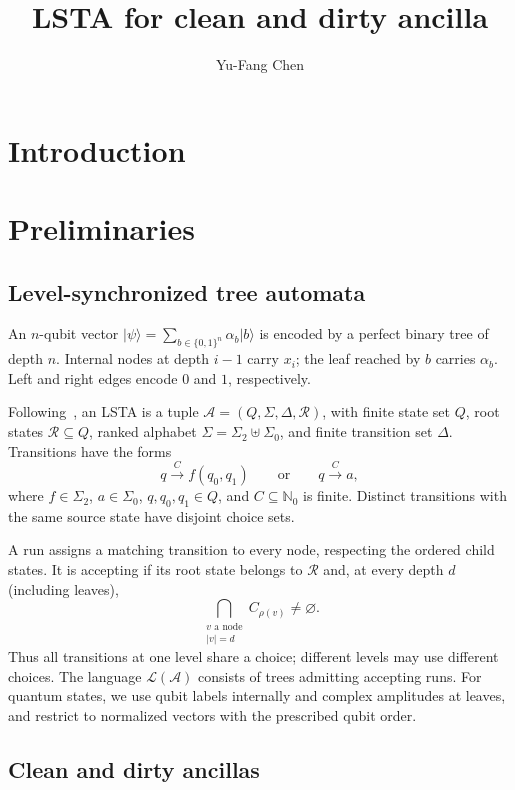 \documentclass[runningheads]{llncs}
\title{LSTA for clean and dirty ancilla}
\author{Yu-Fang Chen}
\institute{Institute of Information Science, Academia Sinica, Taiwan}
\begin{document}
\maketitle

\section{Introduction}

\section{Preliminaries}

\subsection{Level-synchronized tree automata}

An $n$-qubit vector $\lvert\psi\rangle=\sum_{b\in\{0,1\}^n}
\alpha_b\lvert b\rangle$ is encoded by a perfect binary tree of depth $n$.
Internal nodes at depth $i-1$ carry $x_i$; the leaf reached by $b$ carries
$\alpha_b$. Left and right edges encode $0$ and $1$, respectively.

\begin{definition}[LSTA]
Following~\cite{lsta}, an LSTA is a tuple
$\mathcal A=(Q,\Sigma,\Delta,\mathcal R)$, with finite state set $Q$,
root states $\mathcal R\subseteq Q$, ranked alphabet
$\Sigma=\Sigma_2\uplus\Sigma_0$, and finite transition set $\Delta$.
Transitions have the forms
\[
 q\xrightarrow{C} f(q_0,q_1)
 \qquad\text{or}\qquad
 q\xrightarrow{C} a,
\]
where $f\in\Sigma_2$, $a\in\Sigma_0$, $q,q_0,q_1\in Q$, and
$C\subseteq\mathbb N_0$ is finite.
Distinct transitions with the same source state have disjoint choice sets.
\end{definition}

A run assigns a matching transition to every node, respecting the ordered
child states. It is accepting if its root state belongs to $\mathcal R$
and, at every depth $d$ (including leaves),
\[
 \bigcap_{\substack{v\text{ a node}\\ |v|=d}} C_{\rho(v)}
 \neq\varnothing.
\]
Thus all transitions at one level share a choice; different levels may
use different choices. The language $\mathcal L(\mathcal A)$ consists of
trees admitting accepting runs. For quantum states, we use qubit labels
internally and complex amplitudes at leaves, and restrict to normalized
vectors with the prescribed qubit order.

\subsection{Clean and dirty ancillas}
\end{document}
